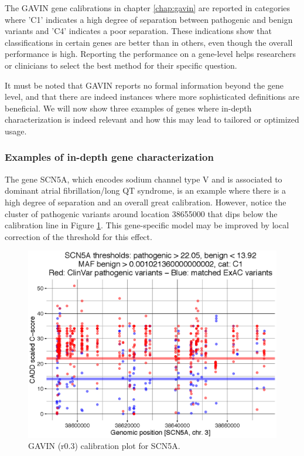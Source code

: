 The GAVIN gene calibrations in chapter \ref{chap:gavin} are reported in categories where 'C1' indicates a high degree of separation between pathogenic and benign variants and 'C4' indicates a poor separation.
These indications show that classifications in certain genes are better than in others, even though the overall performance is high.
Reporting the performance on a gene-level helps researchers or clinicians to select the best method for their specific question.

It must be noted that GAVIN reports no formal information beyond the gene level, and that there are indeed instances where more sophisticated definitions are beneficial.
We will now show three examples of genes where in-depth characterization is indeed relevant and how this may lead to tailored or optimized usage.

\subsubsection*{Examples of in-depth gene characterization}

The gene SCN5A, which encodes sodium channel type V and is associated to dominant atrial fibrillation/long QT syndrome, is an example where there is a high degree of separation and an overall great calibration.
However, notice the cluster of pathogenic variants around location 38655000 that dips below the calibration line in Figure \ref{fig:discussion_scn5a}.
This gene-specific model may be improved by local correction of the threshold for this effect.

\begin{figure}
\centering
\includegraphics[scale=0.8]{img/discussion_scn5a}
\caption{GAVIN (r0.3) calibration plot for SCN5A.}
\label{fig:discussion_scn5a}
\end{figure}

